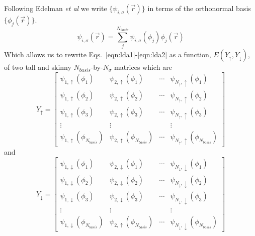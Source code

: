 Following Edelman {\it et al} we write
$\{ \psi_{i,\sigma}(\vec{r}) \}$ in terms of the orthonormal basis
$\{ \phi_j(\vec{r}) \}$.
\begin{equation}
\psi_{i,\sigma}(\vec{r}) = \sum_{j}^{N_{basis}} 
                           \psi_{i,\sigma}(\phi_j) 
                            \phi_j(\vec{r})
\end{equation}
Which allows us to rewrite
Eqs.~\ref{eqn:lda1}-\ref{eqn:lda2} as a function,
$E(Y_{\uparrow},Y_{\downarrow})$,
of two tall and skinny $N_{basis}$-by-$N_{\sigma}$ matrices
which are
\begin{equation}
Y_{\uparrow}=\left[\begin{array}{rrrr}
                    \psi_{1,\uparrow}(\phi_1) 
                     & \psi_{2,\uparrow}(\phi_1) 
                     & \cdots
                     & \psi_{N_{\uparrow},\uparrow}(\phi_1) \\
                    \psi_{1,\uparrow}(\phi_2) 
                     & \psi_{2,\uparrow}(\phi_2) 
                     & \cdots
                     & \psi_{N_{\uparrow},\uparrow}(\phi_2) \\
                    \psi_{1,\uparrow}(\phi_3) 
                     & \psi_{2,\uparrow}(\phi_3) 
                     & \cdots
                     & \psi_{N_{\uparrow},\uparrow}(\phi_3) \\
                    \vdots 
                     & \vdots
                     &
                     & \vdots \\
                    \psi_{1,\uparrow}(\phi_{N_{basis}}) 
                     & \psi_{2,\uparrow}(\phi_{N_{basis}}) 
                     & \cdots
                     & \psi_{N_{\uparrow},\uparrow}(\phi_{N_{basis}})
                   \end{array}
               \right]
\end{equation}
and
\begin{equation}
Y_{\downarrow}=\left[\begin{array}{rrrr}
                    \psi_{1,\downarrow}(\phi_1) 
                     & \psi_{2,\downarrow}(\phi_1) 
                     & \cdots
                     & \psi_{N_{\downarrow},\downarrow}(\phi_1) \\
                    \psi_{1,\downarrow}(\phi_2) 
                     & \psi_{2,\downarrow}(\phi_2) 
                     & \cdots
                     & \psi_{N_{\downarrow},\downarrow}(\phi_2) \\
                    \psi_{1,\downarrow}(\phi_3) 
                     & \psi_{2,\downarrow}(\phi_3) 
                     & \cdots
                     & \psi_{N_{\downarrow},\downarrow}(\phi_3) \\
                    \vdots 
                     & \vdots
                     & 
                     & \vdots \\
                    \psi_{1,\downarrow}(\phi_{N_{basis}}) 
                     & \psi_{2,\uparrow}(\phi_{N_{basis}}) 
                     & \cdots
                     & \psi_{N_{\downarrow},\downarrow}(\phi_{N_{basis}})
                   \end{array}
               \right]
\end{equation}
